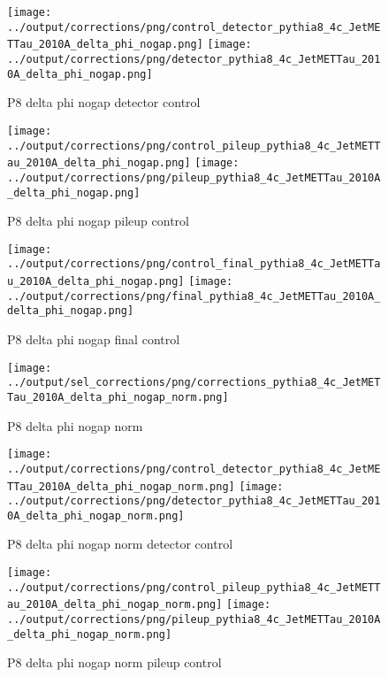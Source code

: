 \documentclass[11pt]{book}
\begin{document}
\begin{figure}[ht]
\centering
\texttt{[image: ../output/corrections/png/control\_detector\_pythia8\_4c\_JetMETTau\_2010A\_delta\_phi\_nogap.png]}
\texttt{[image: ../output/corrections/png/detector\_pythia8\_4c\_JetMETTau\_2010A\_delta\_phi\_nogap.png]}
\caption{P8 delta phi nogap detector control}
\label{fig:p8_JetMETTau_2010A_delta_phi_nogap_detector_control}
\end{figure}

\begin{figure}[ht]
\centering
\texttt{[image: ../output/corrections/png/control\_pileup\_pythia8\_4c\_JetMETTau\_2010A\_delta\_phi\_nogap.png]}
\texttt{[image: ../output/corrections/png/pileup\_pythia8\_4c\_JetMETTau\_2010A\_delta\_phi\_nogap.png]}
\caption{P8 delta phi nogap pileup control}
\label{fig:p8_JetMETTau_2010A_delta_phi_nogap_pileup_control}
\end{figure}


\begin{figure}[ht]
\centering
\texttt{[image: ../output/corrections/png/control\_final\_pythia8\_4c\_JetMETTau\_2010A\_delta\_phi\_nogap.png]}
\texttt{[image: ../output/corrections/png/final\_pythia8\_4c\_JetMETTau\_2010A\_delta\_phi\_nogap.png]}
\caption{P8 delta phi nogap final control}
\label{fig:p8_JetMETTau_2010A_delta_phi_nogap_final_control}
\end{figure}


\begin{figure}[ht]
\centering
\texttt{[image: ../output/sel\_corrections/png/corrections\_pythia8\_4c\_JetMETTau\_2010A\_delta\_phi\_nogap\_norm.png]}
\caption{P8 delta phi nogap norm}
\label{fig:p8_JetMETTau_2010A_delta_phi_nogap_norm}
\end{figure}

\begin{figure}[ht]
\centering
\texttt{[image: ../output/corrections/png/control\_detector\_pythia8\_4c\_JetMETTau\_2010A\_delta\_phi\_nogap\_norm.png]}
\texttt{[image: ../output/corrections/png/detector\_pythia8\_4c\_JetMETTau\_2010A\_delta\_phi\_nogap\_norm.png]}
\caption{P8 delta phi nogap norm detector control}
\label{fig:p8_JetMETTau_2010A_delta_phi_nogap_norm_detector_control}
\end{figure}

\begin{figure}[ht]
\centering
\texttt{[image: ../output/corrections/png/control\_pileup\_pythia8\_4c\_JetMETTau\_2010A\_delta\_phi\_nogap\_norm.png]}
\texttt{[image: ../output/corrections/png/pileup\_pythia8\_4c\_JetMETTau\_2010A\_delta\_phi\_nogap\_norm.png]}
\caption{P8 delta phi nogap norm pileup control}
\label{fig:p8_JetMETTau_2010A_delta_phi_nogap_norm_pileup_control}
\end{figure}
\end{document}
